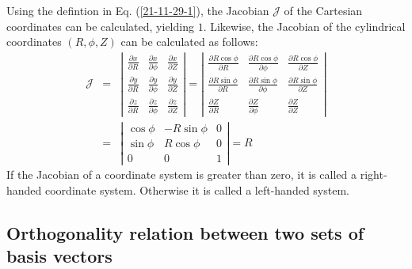\documentclass{llncs}
\begin{document}
Using the defintion in Eq. (\ref{21-11-29-1}), the Jacobian $\mathcal{J}$ of
the Cartesian coordinates can be calculated, yielding $1$. Likewise, the
Jacobian of the cylindrical coordinates $(R, \phi, Z)$ can be calculated as
follows:
\begin{eqnarray*}
  \mathcal{J} & = & \left|\begin{array}{ccc}
    \frac{\partial x}{\partial R} & \frac{\partial x}{\partial \phi} &
    \frac{\partial x}{\partial Z}\\
    \frac{\partial y}{\partial R} & \frac{\partial y}{\partial \phi} &
    \frac{\partial y}{\partial Z}\\
    \frac{\partial z}{\partial R} & \frac{\partial z}{\partial \phi} &
    \frac{\partial z}{\partial Z}
  \end{array}\right| = \left|\begin{array}{ccc}
    \frac{\partial R \cos \phi}{\partial R} & \frac{\partial R \cos
    \phi}{\partial \phi} & \frac{\partial R \cos \phi}{\partial Z}\\
    \frac{\partial R \sin \phi}{\partial R} & \frac{\partial R \sin
    \phi}{\partial \phi} & \frac{\partial R \sin \phi}{\partial Z}\\
    \frac{\partial Z}{\partial R} & \frac{\partial Z}{\partial \phi} &
    \frac{\partial Z}{\partial Z}
  \end{array}\right|\\
  & = & \left|\begin{array}{ccc}
    \cos \phi & - R \sin \phi & 0\\
    \sin \phi & R \cos \phi & 0\\
    0 & 0 & 1
  \end{array}\right| = R
\end{eqnarray*}
If the Jacobian of a coordinate system is greater than zero, it is called a
right-handed coordinate system. Otherwise it is called a left-handed system.

\subsection{Orthogonality relation between two sets of basis vectors}
\end{document}
